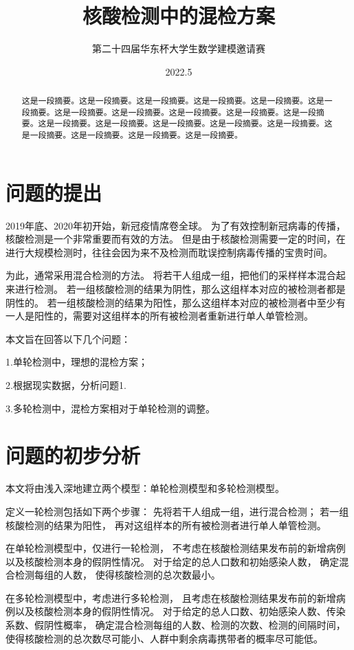 \documentclass[12pt]{article}
\title{核酸检测中的混检方案}
\author{第二十四届华东杯大学生数学建模邀请赛}
\date{2022.5}
\begin{document}
\maketitle

\begin{abstract}
这是一段摘要。这是一段摘要。这是一段摘要。这是一段摘要。这是一段摘要。这是一段摘要。这是一段摘要。这是一段摘要。这是一段摘要。这是一段摘要。这是一段摘要。这是一段摘要。这是一段摘要。这是一段摘要。这是一段摘要。这是一段摘要。这是一段摘要。这是一段摘要。这是一段摘要。这是一段摘要。
\end{abstract}

\newpage
\tableofcontents
\newpage

{\centering\section{问题的提出}}

2019年底、2020年初开始，新冠疫情席卷全球。
为了有效控制新冠病毒的传播，核酸检测是一个非常重要而有效的方法。
但是由于核酸检测需要一定的时间，在进行大规模检测时，往往会因为来不及检测而耽误控制病毒传播的宝贵时间。

为此，通常采用混合检测的方法。
将若干人组成一组，把他们的采样样本混合起来进行检测。
若一组核酸检测的结果为阴性，那么这组样本对应的被检测者都是阴性的。
若一组核酸检测的结果为阳性，那么这组样本对应的被检测者中至少有一人是阳性的，需要对这组样本的所有被检测者重新进行单人单管检测。

本文旨在回答以下几个问题：

1.单轮检测中，理想的混检方案；

2.根据现实数据，分析问题1.

3.多轮检测中，混检方案相对于单轮检测的调整。

{\centering\section{问题的初步分析}}

本文将由浅入深地建立两个模型：单轮检测模型和多轮检测模型。

定义一轮检测包括如下两个步骤：
先将若干人组成一组，进行混合检测；
若一组核酸检测的结果为阳性，
再对这组样本的所有被检测者进行单人单管检测。

在单轮检测模型中，仅进行一轮检测，
不考虑在核酸检测结果发布前的新增病例以及核酸检测本身的假阴性情况。
对于给定的总人口数和初始感染人数，
确定混合检测每组的人数，
使得核酸检测的总次数最小。

在多轮检测模型中，考虑进行多轮检测，
且考虑在核酸检测结果发布前的新增病例以及核酸检测本身的假阴性情况。
对于给定的总人口数、初始感染人数、传染系数、假阴性概率，
确定混合检测每组的人数、检测的次数、检测的间隔时间，
使得核酸检测的总次数尽可能小、人群中剩余病毒携带者的概率尽可能低。
\end{document}
